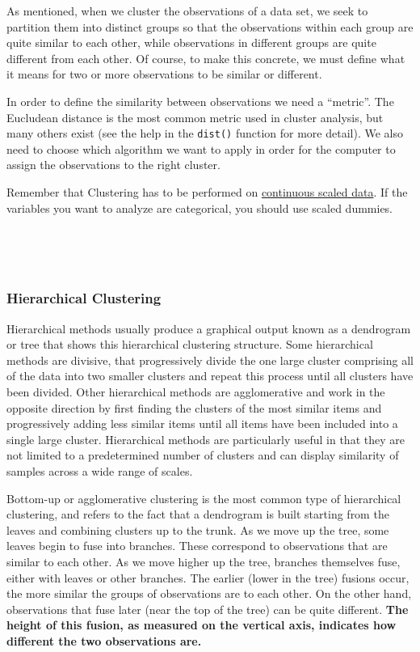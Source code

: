 \documentclass[
]{article}
\begin{document}
As mentioned, when we cluster the observations of a data set, we seek to
partition them into distinct groups so that the observations within each
group are quite similar to each other, while observations in different
groups are quite different from each other. Of course, to make this
concrete, we must define what it means for two or more observations to
be similar or different.

In order to define the similarity between observations we need a
``metric''. The Eucludean distance is the most common metric used in
cluster analysis, but many others exist (see the help in the \texttt{dist()}
function for more detail). We also need to choose which algorithm we
want to apply in order for the computer to assign the observations to
the right cluster.

Remember that Clustering has to be performed on \ul{continuous scaled
data}. If the variables you want to analyze are categorical,
you should use scaled dummies.

~

~

\hypertarget{hierarchical-clustering}{%
\subsubsection{Hierarchical Clustering}\label{hierarchical-clustering}}

Hierarchical methods usually produce a graphical output known as a
dendrogram or tree that shows this hierarchical clustering structure.
Some hierarchical methods are divisive, that progressively divide the
one large cluster comprising all of the data into two smaller clusters
and repeat this process until all clusters have been divided. Other
hierarchical methods are agglomerative and work in the opposite
direction by first finding the clusters of the most similar items and
progressively adding less similar items until all items have been
included into a single large cluster. Hierarchical methods are
particularly useful in that they are not limited to a predetermined
number of clusters and can display similarity of samples across a wide
range of scales.

Bottom-up or agglomerative clustering is the most common type of
hierarchical clustering, and refers to the fact that a dendrogram is
built starting from the leaves and combining clusters up to the trunk.
As we move up the tree, some leaves begin to fuse into branches. These
correspond to observations that are similar to each other. As we move
higher up the tree, branches themselves fuse, either with leaves or
other branches. The earlier (lower in the tree) fusions occur, the more
similar the groups of observations are to each other. On the other hand,
observations that fuse later (near the top of the tree) can be quite
different. \textbf{The height of this fusion, as measured on the vertical
axis, indicates how different the two observations are.}
\end{document}
